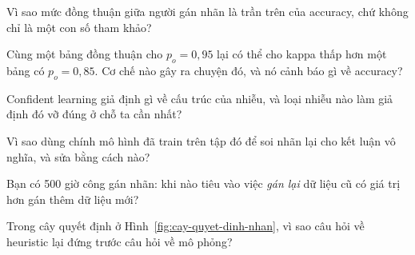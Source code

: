 \documentclass[../../deep_learning.tex]{subfiles}
\begin{document}
\begin{tukiem}
\item Vì sao mức đồng thuận giữa người gán nhãn là trần trên của accuracy, chứ không chỉ là một con số tham khảo?
\item Cùng một bảng đồng thuận cho \(p_o = 0{,}95\) lại có thể cho kappa thấp hơn một bảng có \(p_o = 0{,}85\). Cơ chế nào gây ra chuyện đó, và nó cảnh báo gì về accuracy?
\item Confident learning giả định gì về cấu trúc của nhiễu, và loại nhiễu nào làm giả định đó vỡ đúng ở chỗ ta cần nhất?
\item Vì sao dùng chính mô hình đã train trên tập đó để soi nhãn lại cho kết luận vô nghĩa, và sửa bằng cách nào?
\item Bạn có 500 giờ công gán nhãn: khi nào tiêu vào việc \emph{gán lại} dữ liệu cũ có giá trị hơn gán thêm dữ liệu mới?
\item Trong cây quyết định ở Hình~\ref{fig:cay-quyet-dinh-nhan}, vì sao câu hỏi về heuristic lại đứng trước câu hỏi về mô phỏng?
\end{tukiem}
\ifSubfilesClassLoaded{\printbibliography[title={Nguồn}]}{}
\end{document}
